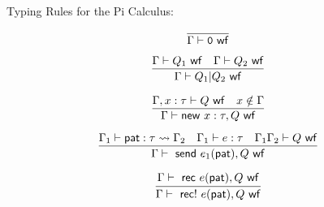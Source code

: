 \documentclass[10pt, letterpaper,proof]{letter}
\begin{document}
Typing Rules for the Pi Calculus:


\[\infer[]{\Gamma \vdash \mathtt{0} \ \mathsf{ wf}}{}\]

\[\infer[]{\Gamma \vdash Q_1 | Q_2 \ \mathsf{ wf}}{\Gamma \vdash Q_1 \ \mathsf{ wf} & \Gamma \vdash Q_2 \ \mathsf{ wf}}\]

\[\infer[]{\Gamma \vdash \mathsf{new}\ x:\tau, Q\ \mathsf{ wf}}{\Gamma, x:\tau \vdash Q \ \mathsf{ wf} & x \notin \Gamma}\]

\[\infer[]{\Gamma \vdash \ \mathsf{send}\ e_1(\mathsf{pat}),Q \ \mathsf{ wf}}{\Gamma_1 \vdash \mathsf{pat}:\tau \leadsto \Gamma_2 & \Gamma_1 \vdash e:\tau & \Gamma_1\Gamma_2 \vdash Q \ \mathsf{ wf}}\]

\[\infer[]{\Gamma \vdash \ \mathsf{rec}!\ e(\mathsf{pat}),Q \ \mathsf{ wf}}{\Gamma \vdash \ \mathsf{rec}\ e(\mathsf{pat}),Q \ \mathsf{ wf}}\]
\end{document}
